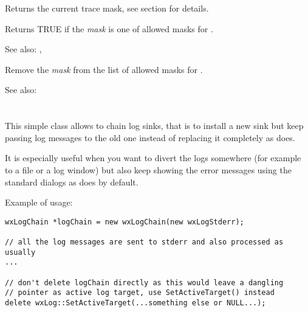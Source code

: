 \label{wxloggettracemask}

Returns the current trace mask, see  section
for details.

\label{wxlogisallowedtracemask}


Returns TRUE if the {\it mask} is one of allowed masks for
.

See also: ,

\label{wxlogremovetracemask}


Remove the {\it mask} from the list of allowed masks for
.

See also: 


\section{}\label{wxlogchain}

This simple class allows to chain log sinks, that is to install a new sink but
keep passing log messages to the old one instead of replacing it completely as
 does.

It is especially useful when you want to divert the logs somewhere (for
example to a file or a log window) but also keep showing the error messages
using the standard dialogs as  does by default.

Example of usage:

\begin{verbatim}
wxLogChain *logChain = new wxLogChain(new wxLogStderr);

// all the log messages are sent to stderr and also processed as usually
...

// don't delete logChain directly as this would leave a dangling
// pointer as active log target, use SetActiveTarget() instead
delete wxLog::SetActiveTarget(...something else or NULL...);

\end{verbatim}

